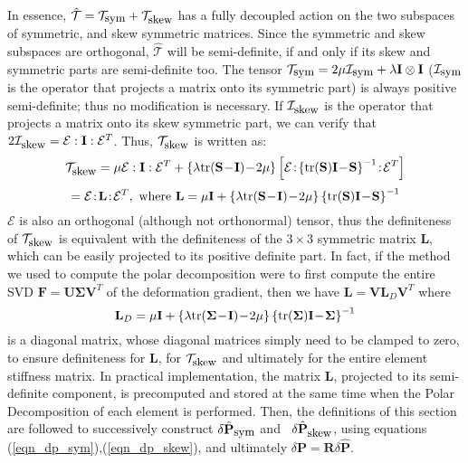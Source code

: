 In essence, $\hat{\mathcal{T}}=\mathcal{T}_{\mbox{\small sym}}+\mathcal{T}_{\mbox{\small skew}}$ has a fully decoupled action on the two subspaces of symmetric, and skew symmetric
matrices. Since the symmetric and skew subspaces are orthogonal, $\hat{\mathcal{T}}$ will be semi-definite, if and only if its skew and symmetric parts are semi-definite too. The
tensor $\mathcal{T}_{\mbox{\small sym}}=2\mu\mathcal{I}_{\mbox{\small sym}}+\lambda\mathbf{I}\otimes\mathbf{I}$ ($\mathcal{I}_{\mbox{\small sym}}$ is the operator that projects a
matrix onto its symmetric part) is always positive semi-definite; thus no modification is necessary. If $\mathcal{I}_{\mbox{\small skew}}$ is the operator that projects a matrix onto
its skew symmetric part, we can verify that $2\mathcal{I}_{\mbox{\small skew}}=\mathcal{E}:\mathbf{I}:\mathcal{E}^T$. Thus, $\mathcal{T}_{\mbox{\small skew}}$ is written as:
$$
\mathcal{T}_{\mbox{\small skew}}=\mu\mathcal{E}:\mathbf{I}:\mathcal{E}^T+\left\{\lambda\tr(\mathbf{S}\!-\!\mathbf{I})\!-\!2\mu\right\}\left[\mathcal{E}\!:\!\left\{\tr(\mathbf{S})\mathbf{I}\!-\!\mathbf{S}\right\}^{-1}\!:\!\mathcal{E}^T\right]
$$
$$
=\mathcal{E}\!:\!\mathbf{L}\!:\!\mathcal{E}^T,\ \mbox{where}\ \mathbf{L}=\mu\mathbf{I}+\left\{\lambda\tr(\mathbf{S}\!-\!\mathbf{I})\!-\!2\mu\right\}\left\{\tr(\mathbf{S})\mathbf{I}\!-\!\mathbf{S}\right\}^{-1}
$$
$\mathcal{E}$ is also an orthogonal (although not orthonormal) tensor, thus the definiteness of $\mathcal{T}_{\mbox{\small skew}}$ is equivalent with the definiteness of the $3\times 3$ 
symmetric matrix $\mathbf{L}$, which can be easily projected to its positive definite part. In fact, if the method we used to compute the polar decomposition were to first compute the
entire SVD $\mathbf{F}=\mathbf{U}\mathbf{\Sigma}\mathbf{V}^T$ of the deformation gradient, then we have $\mathbf{L}=\mathbf{V}\mathbf{L}_D\mathbf{V}^T$ where
$$
\mathbf{L}_D=\mu\mathbf{I}+\left\{\lambda\mbox{tr}(\mathbf{\Sigma}\!-\!\mathbf{I})\!-\!2\mu\right\}\left\{\mbox{tr}(\mathbf{\Sigma})\mathbf{I}\!-\!\mathbf{\Sigma}\right\}^{-1}
$$
is a diagonal matrix, whose diagonal matrices simply need to be clamped to zero, to ensure definiteness for $\mathbf{L}$, for $\mathcal{T}_{\mbox{\small skew}}$ and ultimately for the entire
element stiffness matrix. In practical implementation, the matrix $\mathbf{L}$, projected to its semi-definite component, is precomputed and stored at the same time when the Polar Decomposition
of each element is performed. Then, the definitions of this section are followed to successively construct 
$\delta\hat{\mathbf{P}}_{\mbox{\small sym}}$ and \ $\delta\hat{\mathbf{P}}_{\mbox{\small skew}}$, using equations (\ref{eqn_dp_sym}),(\ref{eqn_dp_skew}), and ultimately
$\delta\mathbf{P}=\mathbf{R}\delta\hat{\mathbf{P}}$. 


